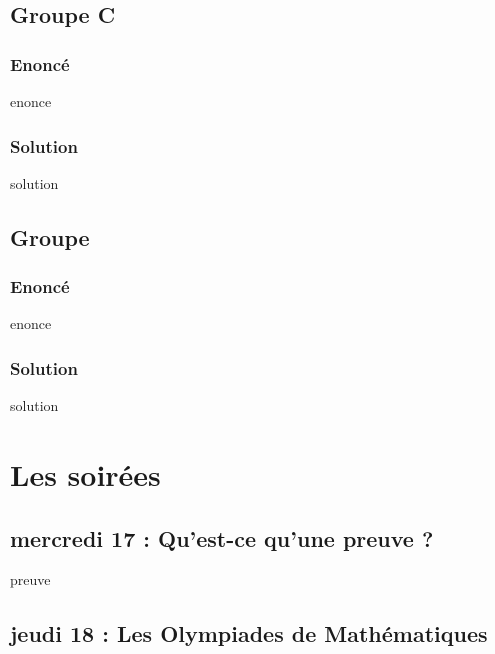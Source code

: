 \documentclass[12pt,A4]{book}
\theoremstyle{definition}
\theoremstyle{thm}
\theoremstyle{def}
\newcounter{sol}[subsection]
\begin{document}
\section{Groupe C}

\subsection{Enoncé}

{enonce}

\subsection{Solution}

{solution}



\section{Groupe }

\subsection{Enoncé}

{enonce}

\subsection{Solution}

{solution}







\chapter{Les soirées}
\minitoc \bigskip


\section{mercredi 17 : Qu'est-ce qu'une preuve ?}

{preuve}



\section{jeudi 18 : Les Olympiades de Mathématiques}
\end{document}
